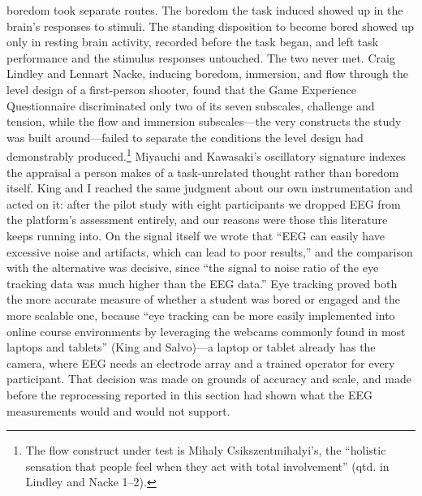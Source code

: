 boredom took separate routes. The boredom the task induced showed up in the brain's responses
to stimuli. The standing disposition to become bored showed up only in resting brain activity,
recorded before the task began, and left task performance and the stimulus responses
untouched. The two never met. Craig Lindley and Lennart Nacke, inducing boredom,
immersion, and flow through the level design of a first-person shooter, found that the Game
Experience Questionnaire discriminated only two of its seven subscales, challenge and tension,
while the flow and immersion subscales---the very constructs the study was built
around---failed to separate the conditions the level design had demonstrably
produced.\footnote{The flow construct under test is Mihaly Csikszentmihalyi's, the ``holistic sensation that people feel when they act with total involvement''
(qtd. in Lindley and Nacke 1--2).} Miyauchi and Kawasaki's oscillatory signature indexes the
appraisal a person makes of a task-unrelated thought rather than boredom itself. King and I
reached the same judgment about our own instrumentation and acted on it: after the pilot study
with eight participants we dropped EEG from the platform's assessment entirely, and our
reasons were those this literature keeps running into. On the signal itself we wrote that
``EEG can easily have excessive noise and artifacts, which can lead to poor results,'' and the comparison with the alternative was decisive, since ``the signal to noise ratio of the eye tracking data was much higher than the EEG data.'' Eye tracking
proved both the more accurate measure of whether a student was bored or engaged and the more
scalable one, because ``eye tracking can be more easily implemented into online course environments by leveraging the webcams commonly found in most laptops and tablets'' (King and Salvo)---a laptop or tablet already has the camera,
where EEG needs an electrode array and a trained operator for every participant. That decision
was made on grounds of accuracy and scale, and made before the reprocessing reported in this
section had shown what the EEG measurements would and would not support.

